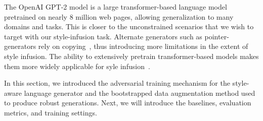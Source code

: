 The OpenAI GPT-2 \citep{radford2019language} model is a large transformer-based language model pretrained on nearly 8 million web pages, allowing generalization to many domains and tasks. This is closer to the unconstrained scenarios that we wish to target with our style-infusion task. Alternate generators such as pointer-generators rely on copying~\citep{xu2019clickbait}, thus introducing more limitations in the extent of style infusion. The ability to extensively pretrain transformer-based models makes them more widely applicable for syle infusion~\citep{gururangan2020pretraining}.

In this section, we introduced the adversarial training mechanism for the style-aware language generator and the bootstrapped data augmentation method used to produce robust generations. Next, we will introduce the baselines, evaluation metrics, and training settings.

